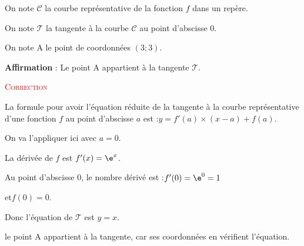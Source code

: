 \begin{enumerate}
		On note \mbox{$\mathcal{C}$} la courbe représentative de la fonction $f$ dans un repère.

		On note \mbox{$\mathcal{T}$} la tangente à la courbe \mbox{$\mathcal{C}$} au point d'abscisse $0$.

		On note A le point de coordonnées \mbox{$(3;3)$.}

		\vspace{5mm}

		\textbf{Affirmation} : Le point A appartient à la tangente \mbox{$\mathcal{T}$}.


		\textcolor{red}{\textsc{Correction}}

		La formule pour avoir l'équation réduite de la tangente à la courbe représentative d'une fonction $f$ au point d'abscisse $a$ est :\quad $y = f'(a)\times (x - a) + f(a)$.

		On va l'appliquer ici avec $a = 0$.

		La dérivée de $f$ est \quad \mbox{$f'(x)=\e^{x}$}.

		Au point d'abscisse $0$, le nombre dérivé est :\quad $f'(0) = \e^{0} = 1$

		et\quad  $f(0)=0$.

		Donc l'équation de \mbox{$\mathcal{T}$} est \quad \mbox{$y=x$}.

		le point A appartient à la tangente, car ses coordonnées en vérifient l'équation.

		\hfill {}
\end{enumerate}
